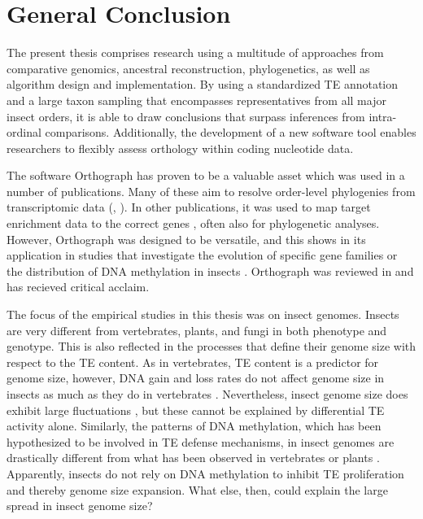\chapter{General Conclusion}
\label{conclusion}

The present thesis comprises research using a multitude of approaches
from comparative genomics, ancestral reconstruction, phylogenetics,
as well as algorithm design and implementation. By using a standardized TE
annotation and a large taxon sampling that encompasses representatives
from all major insect orders, it is able to draw conclusions that
surpass inferences from intra-ordinal comparisons.  Additionally, the
development of a new software tool enables researchers to flexibly
assess orthology within coding nucleotide data.

The software Orthograph has proven to be a valuable asset which was used
in a number of publications. Many of these aim to resolve order-level
phylogenies from transcriptomic data (\eg, \citet{Peters2017, Bank2017,
Kutty2018, Simon2018, Gillung2018, Johnson2018}). In other publications,
it was used to map target enrichment data to the correct genes
\citep{Mayer2016, Shin2018, Sann2018}, often also for phylogenetic
analyses. However, Orthograph was designed to be versatile, and this
shows in its application in studies that investigate the evolution of
specific gene families \citep{Pauli2016, Dowling2017} or the
distribution of DNA methylation in insects \citep{Provataris2018}.
Orthograph was reviewed in \citet{Nichio2017} and has recieved critical
acclaim.

The focus of the empirical studies in this thesis was on insect genomes.
Insects are very different from vertebrates, plants, and fungi in both phenotype
and genotype. This is also reflected in the processes that define their
genome size with respect to the TE content. As in vertebrates, TE
content is a predictor for genome size, however,  DNA gain and loss
rates do not affect genome size in insects as much as they do in
vertebrates \citep{Kapusta2017-1,Lindblad-Toh2005}.  Nevertheless,
insect genome size does exhibit large fluctuations \citep{Alfsnes2017},
but these cannot be explained by differential TE activity alone.
Similarly, the patterns of DNA methylation, which has been hypothesized
to be involved in TE defense mechanisms, in insect genomes are
drastically different from what has been observed in vertebrates or
plants \citep{Provataris2018,Suzuki2008}.  Apparently, insects do not
rely on DNA methylation to inhibit TE proliferation and thereby genome
size expansion. What else, then, could explain the large spread in
insect genome size?

